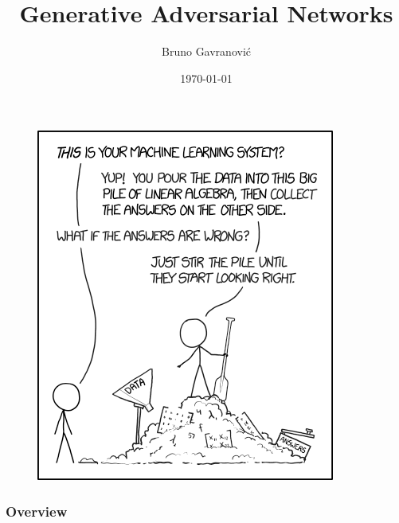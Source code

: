 \documentclass{Bredelebeamer}
\title[GAN]{Generative Adversarial Networks} %
\author{Bruno Gavranović} %
\institute[PSIML2017] %
{
Petnica Summer School of Machine Learning\\ %
\medskip
\textit{bruno.gavranovic@fer.hr} %
}
\date{\today} %
\begin{document}
\begin{frame}
	\begin{figure}[h!]
		\centering
		\includegraphics[height=0.9\textheight]{xkcd_ml.png}
	\end{figure}
\end{frame}

\begin{frame}
\titlepage %
\end{frame}

\begin{frame}
\frametitle{Overview} %
\tableofcontents %
\end{frame}


\end{document}
